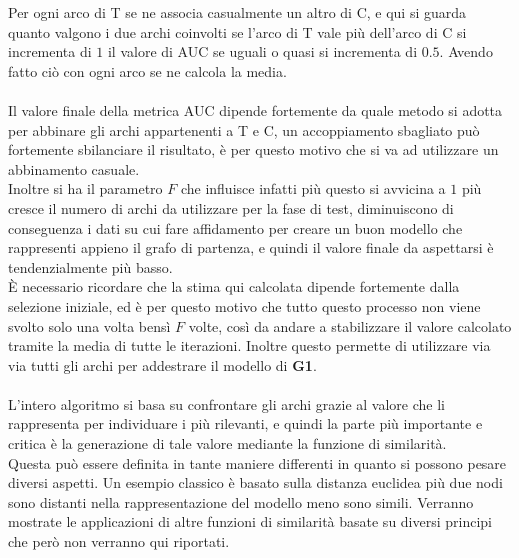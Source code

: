 Per ogni arco di T se ne associa casualmente un altro di C, e qui si guarda quanto valgono i due archi coinvolti se l'arco di T vale più dell'arco di C si incrementa di $1$ il valore di AUC se uguali o quasi si incrementa di $0.5$. Avendo fatto ciò con ogni arco se ne calcola la media.\\
\\
Il valore finale della metrica AUC dipende fortemente da quale metodo si adotta per abbinare gli archi appartenenti a T e C, un accoppiamento sbagliato può fortemente sbilanciare il risultato, è per questo motivo che si va ad utilizzare un abbinamento casuale.\\
Inoltre si ha il parametro $F$ che influisce infatti più questo si avvicina a $1$ più cresce il numero di archi da utilizzare per la fase di test, diminuiscono di conseguenza i dati su cui fare affidamento per creare un buon modello che rappresenti appieno il grafo di partenza, e quindi il valore finale da aspettarsi è tendenzialmente più basso.\\
È necessario ricordare che la stima qui calcolata dipende fortemente dalla selezione iniziale, ed è per questo motivo che tutto questo processo non viene svolto solo una volta bensì $F$ volte, così da andare a stabilizzare il valore calcolato tramite la media di tutte le iterazioni. Inoltre questo permette di utilizzare via via tutti gli archi per addestrare il modello di \textbf{G1}.\\
\\
L'intero algoritmo si basa su confrontare gli archi grazie al valore che li rappresenta per individuare i più rilevanti, e quindi la parte più importante e critica è la generazione di tale valore mediante la funzione di similarità.\\
Questa può essere definita in tante maniere differenti in quanto si possono pesare diversi aspetti. Un esempio classico è basato sulla distanza euclidea più due nodi sono distanti nella rappresentazione del modello meno sono simili. Verranno mostrate le applicazioni di altre funzioni di similarità basate su diversi principi che però non verranno qui riportati.
%

